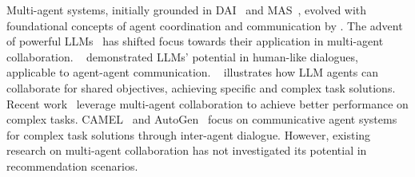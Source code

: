 Multi-agent systems, initially grounded in DAI~\cite{chaib1992trends} and MAS~\cite{stone2000multiagent}, evolved with foundational concepts of agent coordination and communication by \citet{wooldridge1995intelligent}.
The advent of powerful LLMs~\cite{brown2020language, gpt42023technical, touvron2023llama, zeng2022glm} has shifted focus towards their application in multi-agent collaboration. ~\citet{brown2020language} demonstrated LLMs' potential in human-like dialogues, applicable to agent-agent communication. ~\citet{vinyals2019grandmaster, nascimento2023gpt} illustrates how LLM agents can collaborate for shared objectives, achieving specific and complex task solutions. 
Recent work~\cite{du2023improving, zhang2023building, chen2023agentverse} leverage multi-agent collaboration to achieve better performance on complex tasks. CAMEL~\cite{li2023camel} and AutoGen~\cite{wu2023autogen} focus on communicative agent systems for complex task solutions through inter-agent dialogue. 
However, existing research on multi-agent collaboration has not investigated its potential in recommendation scenarios.


